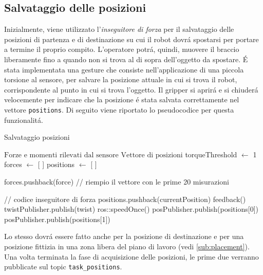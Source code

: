 \subsection{Salvataggio delle posizioni} \label{sub:positions}
Inizialmente, viene utilizzato l'\textit{inseguitore di forza} per il salvataggio delle posizioni di partenza e di destinazione 
su cui il robot dovr\'{a} spostarsi per portare a termine il proprio compito. 
L'operatore potr\'{a}, quindi, muovere il braccio liberamente fino a quando non si trova al di sopra dell'oggetto da spostare. 
\'{E} stata implementata una gesture che consiste nell'applicazione di una piccola torsione al sensore, 
per salvare la posizione attuale in cui si trova il robot, corrispondente al punto in cui si trova l'oggetto. Il gripper 
si aprir\'{a} e si chiuder\'{a} velocemente per indicare che la posizione \'{e} stata salvata correttamente nel vettore 
\verb|positions|. Di seguito viene riportato lo pseudocodice per questa funzionalit\'{a}.
\begin{algorithm}[H]
    \caption{Salvataggio posizioni}\label{algo:positions}
    \begin{algorithmic}[1]
        \Require $\text{Forze e momenti rilevati dal sensore}$
        \Ensure $\text{Vettore di posizioni}$
        \State torqueThreshold $\gets$ 1
        \State forces $\gets$ [ ]
        \State positions $\gets$ [ ]
        
                \State forces.pushback(force) // riempio il vettore con le prime 20 misurazioni
            \Else

                // codice inseguitore di forza
                    \State positions.pushback(currentPosition)
                    \State feedback()
                \EndIf
                \State twistPublisher.publish(twist)
            \EndIf
            \State ros::speedOnce()
        \EndWhile
        \State posPublisher.publish(positions[0])
        \State posPublisher.publish(positions[1])
    \end{algorithmic}
    \end{algorithm}
Lo stesso dovr\'{a} essere fatto anche per la posizione di destinazione e per una posizione fittizia in una zona libera 
del piano di lavoro (vedi \ref{sub:placement}). Una volta terminata la fase di acquisizione delle posizioni, 
le prime due verranno pubblicate sul topic \verb|task_positions|.
